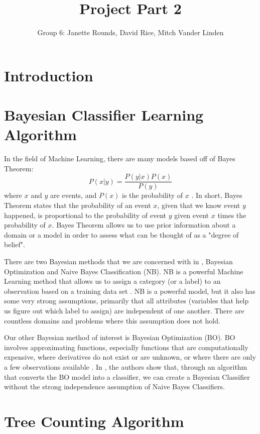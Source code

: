 \documentclass[]{article}
\title{Project Part 2}
\author{Group 6: Janette Rounds, David Rice, Mitch Vander Linden}
\begin{document}
\maketitle

\section{Introduction}

\section{Bayesian Classifier Learning Algorithm}
In the field of Machine Learning, there are many models based off of Bayes Theorem: 
$$P(x|y) = \frac{P(y|x)P(x)}{P(y)}$$ where $x$ and $y$ are events, and $P(x)$ is the probability of $x$ \cite{koller2009probabilistic}.  In short, Bayes Theorem states that the probability of an event $x$, given that we know event $y$ happened, is proportional to the probability of event $y$ given event $x$ times the probability of $x$. Bayes Theorem allows us to use prior information about a domain or a model in order to assess what can be thought of as a "degree of belief". 

There are two Bayesian methods that we are concerned with in \cite[Liu 2013]{liu2013bayesian}, Bayesian Optimization and Naive Bayes Classification (NB).  NB is a powerful Machine Learning method that allows us to assign a category (or a label) to an observation based on a training data set \cite{koller2009probabilistic}. NB is a powerful model, but it also has some very strong assumptions, primarily that all attributes (variables that help us figure out which label to assign) are independent of one another. There are countless domains and problems where this assumption does not hold. 

Our other Bayesian method of interest is Bayesian Optimization (BO). BO involves approximating functions, especially functions that are computationally expensive, where derivatives do not exist or are unknown, or where there are only a few observations available \cite{brochu2010tutorial}. In \cite[Liu 2013]{liu2013bayesian}, the authors show that, through an algorithm that converts the BO model into a classifier, we can create a Bayesian Classifier without the strong independence assumption of Naive Bayes Classifiers. 

\section{Tree Counting Algorithm}
\cite[Santoro 2013]{santoro2013tree}
\end{document}
